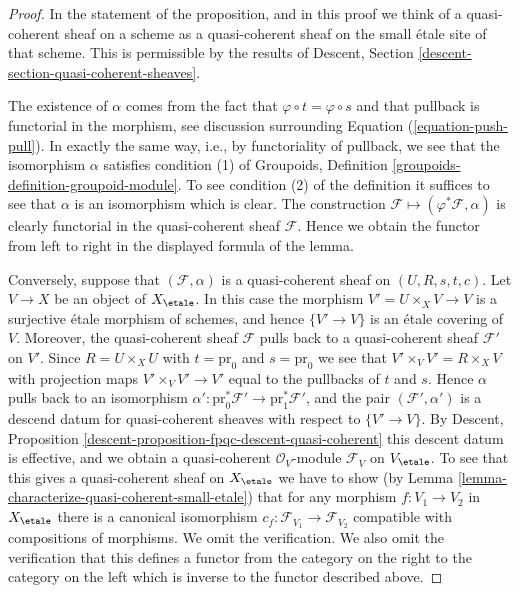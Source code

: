 \begin{proof}
In the statement of the proposition, and in this proof we think of a
quasi-coherent sheaf on a scheme as a quasi-coherent sheaf on the small
\'etale site of that scheme. This is permissible by the results of
Descent, Section \ref{descent-section-quasi-coherent-sheaves}.

\medskip\noindent
The existence of $\alpha$ comes from the fact that
$\varphi \circ t = \varphi \circ s$ and that pullback is
functorial in the morphism, see discussion surrounding
Equation (\ref{equation-push-pull}). In exactly the same way, i.e., by
functoriality of pullback, we see that the isomorphism $\alpha$ satisfies
condition (1) of
Groupoids, Definition \ref{groupoids-definition-groupoid-module}.
To see condition (2) of the definition it suffices to see that $\alpha$
is an isomorphism which is clear. The construction
$\mathcal{F} \mapsto (\varphi^*\mathcal{F}, \alpha)$
is clearly functorial in the quasi-coherent sheaf $\mathcal{F}$.
Hence we obtain the functor from left to right in the displayed
formula of the lemma.

\medskip\noindent
Conversely, suppose that $(\mathcal{F}, \alpha)$ is a quasi-coherent
sheaf on $(U, R, s, t, c)$. Let $V \to X$ be an object of $X_\etale$.
In this case the morphism $V' = U \times_X V \to V$ is a surjective \'etale
morphism of schemes, and hence $\{V' \to V\}$ is an \'etale
covering of $V$. Moreover, the quasi-coherent sheaf $\mathcal{F}$
pulls back to a quasi-coherent sheaf $\mathcal{F}'$ on $V'$.
Since $R = U \times_X U$ with $t = \text{pr}_0$ and $s = \text{pr}_0$
we see that $V' \times_V V' = R \times_X V$ with projection maps
$V' \times_V V' \to V'$ equal to the pullbacks of $t$ and $s$. Hence
$\alpha$ pulls back to an isomorphism
$\alpha' : \text{pr}_0^*\mathcal{F}' \to \text{pr}_1^*\mathcal{F}'$, and
the pair $(\mathcal{F}', \alpha')$ is a descend datum for quasi-coherent
sheaves with respect to $\{V' \to V\}$. By
Descent, Proposition
\ref{descent-proposition-fpqc-descent-quasi-coherent}
this descent datum is effective, and we obtain a quasi-coherent
$\mathcal{O}_V$-module $\mathcal{F}_V$ on $V_\etale$.
To see that this gives a quasi-coherent sheaf on $X_\etale$ we have
to show (by
Lemma \ref{lemma-characterize-quasi-coherent-small-etale})
that for any morphism $f : V_1 \to V_2$ in $X_\etale$
there is a canonical isomorphism
$c_f : \mathcal{F}_{V_1} \to \mathcal{F}_{V_2}$
compatible with compositions of morphisms. We omit the verification.
We also omit the verification that this defines a functor from the
category on the right to the category on the left which is inverse
to the functor described above.
\end{proof}

